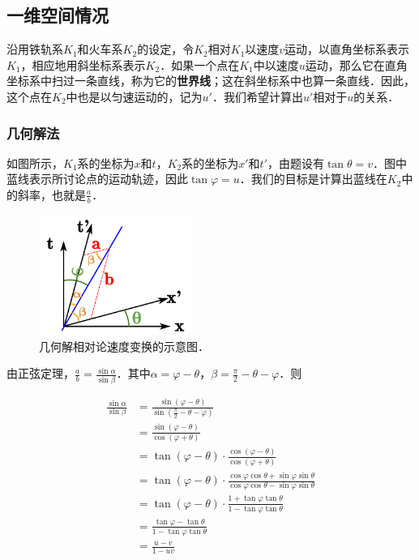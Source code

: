 
\subsection{一维空间情况}

沿用铁轨系$K_1$和火车系$K_2$的设定，令$K_2$相对$K_1$以速度$v$运动，以直角坐标系表示$K_1$，相应地用斜坐标系表示$K_2$．如果一个点在$K_1$中以速度$u$运动，那么它在直角坐标系中扫过一条直线，称为它的\textbf{世界线}；这在斜坐标系中也算一条直线．因此，这个点在$K_2$中也是以匀速运动的，记为$u'$．我们希望计算出$u'$相对于$u$的关系．


\subsubsection{几何解法}

如图所示，$K_1$系的坐标为$x$和$t$，$K_2$系的坐标为$x'$和$t'$，由题设有$\tan{\theta}=v$．图中蓝线表示所讨论点的运动轨迹，因此$\tan{\varphi}=u$．我们的目标是计算出蓝线在$K_2$中的斜率，也就是$\frac{a}{b}$．


\begin{figure}[ht]
\centering
\includegraphics[width=5cm]{./figures/RelVel_1.pdf}
\caption{几何解相对论速度变换的示意图．} \label{RelVel_fig1}
\end{figure}

由正弦定理，$\frac{a}{b}=\frac{\sin{\alpha}}{\sin{\beta}}$．其中$\alpha=\varphi-\theta$，$\beta=\frac{\pi}{2}-\theta-\varphi$．则

\begin{equation}\label{RelVel_eq1}
\begin{aligned}

\frac{\sin{\alpha}}{\sin{\beta}}&=\frac{\sin{(\varphi-\theta)}}{\sin{(\frac{\pi}{2}-\theta-\varphi)}}\\
&=\frac{\sin{(\varphi-\theta)}}{\cos{(\varphi+\theta)}}\\
&=\tan(\varphi-\theta)\cdot\frac{\cos(\varphi-\theta)}{\cos(\varphi+\theta)}\\
&=\tan(\varphi-\theta)\cdot\frac{\cos\varphi\cos\theta+\sin\varphi\sin\theta}{\cos\varphi\cos\theta-\sin\varphi\sin\theta}\\
&=\tan(\varphi-\theta)\cdot\frac{1+\tan\varphi\tan\theta}{1-\tan\varphi\tan\theta}\\

&=\frac{\tan\varphi-\tan\theta}{1-\tan\varphi\tan\theta}\\
&=\frac{u-v}{1-uv}

\end{aligned}
\end{equation}

